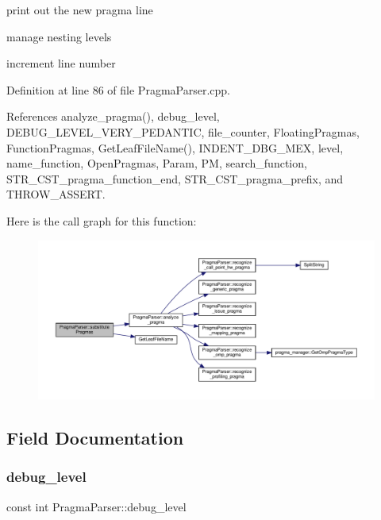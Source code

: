 print out the new pragma line

manage nesting levels

increment line number 

Definition at line 86 of file Pragma\+Parser.\+cpp.



References analyze\+\_\+pragma(), debug\+\_\+level, D\+E\+B\+U\+G\+\_\+\+L\+E\+V\+E\+L\+\_\+\+V\+E\+R\+Y\+\_\+\+P\+E\+D\+A\+N\+T\+IC, file\+\_\+counter, Floating\+Pragmas, Function\+Pragmas, Get\+Leaf\+File\+Name(), I\+N\+D\+E\+N\+T\+\_\+\+D\+B\+G\+\_\+\+M\+EX, level, name\+\_\+function, Open\+Pragmas, Param, PM, search\+\_\+function, S\+T\+R\+\_\+\+C\+S\+T\+\_\+pragma\+\_\+function\+\_\+end, S\+T\+R\+\_\+\+C\+S\+T\+\_\+pragma\+\_\+prefix, and T\+H\+R\+O\+W\+\_\+\+A\+S\+S\+E\+RT.

Here is the call graph for this function\+:
\nopagebreak
\begin{figure}[H]
\begin{center}
\leavevmode
\includegraphics[width=350pt]{d6/d6c/classPragmaParser_a349706150aebec2e28658e6a880da5e0_cgraph}
\end{center}
\end{figure}


\subsection{Field Documentation}
\mbox{\label{classPragmaParser_a9f08edfb28626e742354f50b6d1b9109}} 
\subsubsection{\texorpdfstring{debug\+\_\+level}{debug\_level}}
{\footnotesize\ttfamily const int Pragma\+Parser\+::debug\+\_\+level\hspace{0.3cm}{\ttfamily [private]}}



